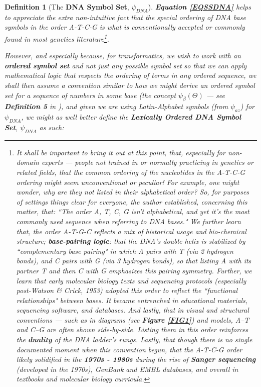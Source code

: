 \documentclass[a4paper, 18pt]{book} %
\newtheorem{defn}{Definition}
\begin{document}
{\begin{minipage}{0.9\textwidth}
\begin{defn}[The \textbf{DNA Symbol Set}, $\psi_{DNA}$]
\textbf{Equation \ref{EQSSDNA}} helps to appreciate the extra non-intuitive fact that the special ordering of DNA base symbols in the order A-T-C-G is what is conventionally accepted\cite{nature_atcg}\cite{wikipedia_nucleic_acid} or commonly found in most genetics literature\footnote{It shall be important to bring it out at this point, that, especially for non-domain experts --- people not trained in or normally practicing in genetics or related fields, that the common ordering of the nucleotides in the A-T-C-G ordering might seem unconventional or peculiar! For example, one might wonder, why are they not listed in their alphabetical order? So, for purposes of settings things clear for everyone, the author established\cite{copilot_dna_assistant}, concerning this matter, that: ``The order A, T, C, G isn't alphabetical, and yet it's the most commonly used sequence when referring to DNA bases." We further learn that, the order A-T-G-C reflects a mix of historical usage and bio-chemical structure; \textbf{base-pairing logic}: that the DNA's double-helix is stabilized by ``complementary base pairing" in which A pairs with T (via 2 hydrogen bonds), and C pairs with G (via 3 hydrogen bonds), so that listing A with its partner T and then C with G emphasizes this pairing symmetry\cite{copilot_dna_assistant}. Further, we learn that early molecular biology texts and sequencing protocols (especially post-Watson \& Crick, 1953) adopted this order to reflect the ``functional relationships" between bases. It became entrenched in educational materials, sequencing software, and databases. And lastly, that in visual and structural conventions --- such as in diagrams (see \textbf{Figure \ref{FIG1}}) and models, A–T and C–G are often shown side-by-side. Listing them in this order reinforces the \textbf{duality} of the DNA ladder's rungs\cite{copilot_dna_assistant}. Lastly, that though there is no single documented moment when this convention begun, that the A-T-C-G order likely solidified in the \textbf{1970s - 1980s} during the rise of \textbf{Sanger sequencing} (developed in the 1970s), GenBank and EMBL databases, and overall in textbooks and molecular biology curricula.}.

However, and especially because, for transformatics, we wish to work with an \textbf{ordered symbol set}\cite{ossipaper} and not just \textit{any possible symbol set} so that we can apply mathematical logic that respects the ordering of terms in any ordered sequence\cite{transformatics}, we shall then assume a convention similar to how we might derive an ordered symbol set for a sequence of numbers in some base (the concept $\psi_\beta(\Theta)$ --- see \textbf{Definition 5} in \cite{ossipaper}), and given we are using Latin-Alphabet symbols (from $\psi_{az}$\cite{transformatics}) for $\psi_{DNA}$, we might as well better define the \textbf{Lexically Ordered DNA Symbol Set}, $\psi_{DNA}$ as such:


\end{defn}
\end{minipage}}
\end{document}
